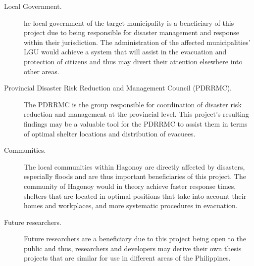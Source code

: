 \begin{description}
\item[Local Government.] he local government of the target municipality is a beneficiary of this project due to being responsible for disaster management and response within their jurisdiction. The administration of the affected municipalities’ LGU would achieve a system that will assist in the evacuation and protection of citizens and thus may divert their attention elsewhere into other areas.

\item[Provincial Disaster Risk Reduction and Management Council (PDRRMC).] The PDRRMC is the group responsible for coordination of disaster risk reduction and management at the provincial level. This project’s resulting findings may be a valuable tool for the PDRRMC to assist them in terms of optimal shelter locations and distribution of evacuees.

\item[Communities.] The local communities within Hagonoy are directly affected by disasters, especially floods and are thus important beneficiaries of this project. The community of Hagonoy would in theory achieve faster response times, shelters that are located in optimal positions that take into account their homes and workplaces, and more systematic procedures in evacuation.

\item[Future researchers.] Future researchers are a beneficiary due to this project being open to the public and thus, researchers and developers may derive their own thesis projects that are similar for use in different areas of the Philippines.

\end{description}
